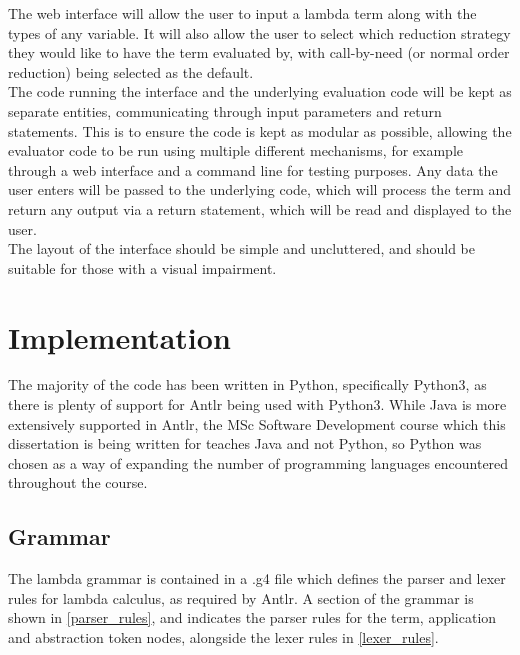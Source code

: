 \documentclass[a4paper,12pt]{report}
\begin{document}
The web interface will allow the user to input a lambda term along with the types of any variable. It will also allow the user to select which reduction strategy they would like to have the term evaluated by, with call-by-need (or normal order reduction) being selected as the default.\\

The code running the interface and the underlying evaluation code will be kept as separate entities, communicating through input parameters and return statements. This is to ensure the code is kept as modular as possible, allowing the evaluator code to be run using multiple different mechanisms, for example through a web interface and a command line for testing purposes. Any data the user enters will be passed to the underlying code, which will process the term and return any output via a return statement, which will be read and displayed to the user.\\

The layout of the interface should be simple and uncluttered, and should be suitable for those with a visual impairment.

\section{Implementation}

The majority of the code has been written in Python, specifically Python3, as there is plenty of support for Antlr being used with Python3. While Java is more extensively supported in Antlr, the MSc Software Development course which this dissertation is being written for teaches Java and not Python, so Python was chosen as a way of expanding the number of programming languages encountered throughout the course.

\subsection{Grammar}

The lambda grammar is contained in a .g4 file which defines the parser and lexer rules for lambda calculus, as required by Antlr. A section of the grammar is shown in \ref{parser_rules}, and indicates the parser rules for the term, application and abstraction token nodes, alongside the lexer rules in \ref{lexer_rules}.
\end{document}
